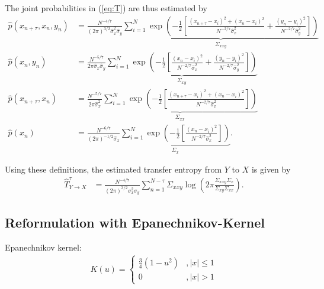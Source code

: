\documentclass[12pt,a4paper,twoside,english,fleqn,preprint,aps,prb]{revtex4}
\begin{document}
The joint probabilities in (\ref{eq:T}) are thus estimated by
\begin{align}
  \hat{p}(x_{n+\tau}, x_n, y_n) &= \frac{N^{-4/7}}{(2\pi)^{3/2} \hat{\sigma}_x^2 \hat{\sigma}_y} \underbrace{\sum_{i=1}^N \exp \left(-\frac{1}{2} \left[
                                       \frac{(x_{n+\tau}-x_i)^2 + (x_n - x_i)^2}{N^{-2/7}\hat{\sigma}_x^2} + \frac{(y_n - y_i)^2}{N^{-2/7}\hat{\sigma}_y^2}
                                 \right] \right)}_{\Sigma_{xxy}}  \\
                                 \hat{p}(x_n, y_n) &= \frac{N^{-5/7}}{2\pi \hat{\sigma}_x \hat{\sigma}_y} \underbrace{\sum_{i=1}^N \exp \left(-\frac{1}{2} \left[
                                       \frac{(x_n - x_i)^2}{N^{-2/7}\hat{\sigma}_x^2} + \frac{(y_n - y_i)^2}{N^{-2/7}\hat{\sigma}_y^2}
                                 \right] \right)}_{\Sigma_{xy}}  \\
                                 \hat{p}(x_{n+\tau}, x_n) &= \frac{N^{-5/7}}{2\pi \hat{\sigma}_x^2} \underbrace{\sum_{i=1}^N \exp \left(-\frac{1}{2} \left[
                                       \frac{(x_{n+\tau} - x_i)^2 + (x_n - x_i)^2}{N^{-2/7}\hat{\sigma}_x^2}
                                 \right] \right) }_{\Sigma_{xx}} \\
                                   \hat{p}(x_n) &= \frac{N^{-6/7}}{(2\pi)^{-1/2} \hat{\sigma}_x} \underbrace{\sum_{i=1}^N \exp \left(-\frac{1}{2} \left[
                                       \frac{(x_n - x_i)^2}{N^{-2/7}\hat{\sigma}_x^2}
                                 \right] \right)}_{\Sigma_{x}}.
\end{align}

Using these definitions, the estimated transfer entropy from $Y$ to $X$ is given by
\begin{align}
  \hat{T}_{Y \rightarrow X}^{\tau} &= \frac{N^{-4/7}}{(2\pi)^{3/2}\sigma_x^2 \sigma_y}
                                        \sum_{n=1}^{N-\tau} \Sigma_{xxy} \log\left(2\pi \frac{\Sigma_{xxy} \Sigma_{x}}{\Sigma_{xy} \Sigma_{xx}} \right).
\end{align}


\subsection{Reformulation with Epanechnikov-Kernel}
Epanechnikov kernel:
\begin{align}
  K(u) = \begin{cases}
            \frac{3}{4}(1-u^{2}) &, |x| \leq 1\\
                               0 &, |x| > 1
         \end{cases}
\end{align}





\end{document}
